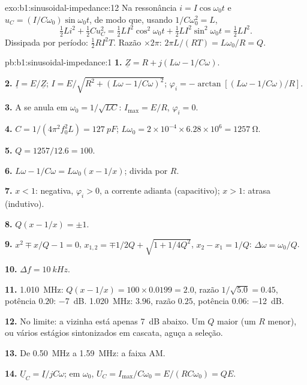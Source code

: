 \begin{solution}{exo:b1:sinusoidal-impedance:12}
Na ressonância $i = I\cos\omega_0 t$ e $u_C = (I/C\omega_0)\sin\omega_0 t$,
de modo que, usando $1/C\omega_0^2 = L$,
\[
\tfrac12 Li^2 + \tfrac12 Cu_C^2 = \tfrac12 LI^2\cos^2\omega_0 t
+ \tfrac12 LI^2\sin^2\omega_0 t = \tfrac12 LI^2 .
\]
Dissipada por período: $\tfrac12 RI^2T$. Razão $\times 2\pi$: $2\pi L/(RT)
= L\omega_0/R = Q$.
\end{solution}

\begin{solution}{pb:b1:sinusoidal-impedance:1}
\textbf{1.} $\underline Z = R + j(L\omega - 1/C\omega)$.

\textbf{2.} $\underline I = E/\underline Z$; $I = E/\sqrt{R^2 + (L\omega -
1/C\omega)^2}$; $\varphi_i = -\arctan[(L\omega - 1/C\omega)/R]$.

\textbf{3.} A  se anula em $\omega_0 = 1/\sqrt{LC}$: $I_{\max}
= E/R$, $\varphi_i = 0$.

\textbf{4.} $C = 1/(4\pi^2f_0^2L) = \qty{127}{pF}$; $L\omega_0 = 2\times10^{-4}
\times 6.28\times10^6 = \qty{1257}{\ohm}$.

\textbf{5.} $Q = 1257/12.6 = 100$.

\textbf{6.} $L\omega - 1/C\omega = L\omega_0(x - 1/x)$; divida por $R$.

\textbf{7.} $x < 1$:  negativa, $\varphi_i > 0$, a corrente
adianta (capacitivo); $x > 1$: atrasa (indutivo).

\textbf{8.} $Q(x - 1/x) = \pm1$.

\textbf{9.} $x^2 \mp x/Q - 1 = 0$, $x_{1,2} = \mp1/2Q + \sqrt{1 + 1/4Q^2}$,
$x_2 - x_1 = 1/Q$: $\Delta\omega = \omega_0/Q$.

\textbf{10.} $\Delta f = \qty{10}{kHz}$.

\textbf{11.} \qty{1.010}{MHz}: $Q(x - 1/x) = 100 \times 0.0199 = 2.0$,
razão $1/\sqrt{5.0} = 0.45$, potência $0.20$: \qty{-7}{dB}. \qty{1.020}{MHz}:
$3.96$, razão $0.25$, potência $0.06$: \qty{-12}{dB}.

\textbf{12.} No limite: a vizinha está apenas \qty{7}{dB} abaixo. Um
$Q$ maior (um $R$ menor), ou vários estágios sintonizados em cascata, aguça a
seleção.

\textbf{13.} De \qty{0.50}{MHz} a \qty{1.59}{MHz}: a faixa AM.

\textbf{14.} $\underline U_C = \underline I/jC\omega$; em $\omega_0$,
$U_C = I_{\max}/C\omega_0 = E/(RC\omega_0) = QE$.


\end{solution}
